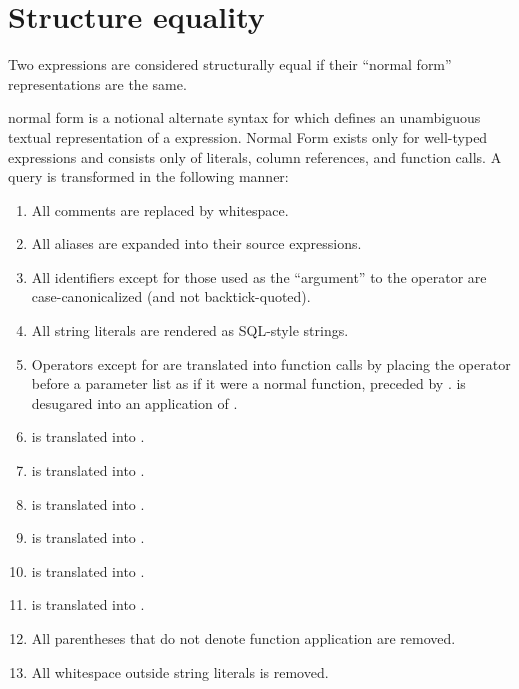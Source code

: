 \documentclass{article}
\begin{document}
\section{Structure equality}\label{structuralequality}

Two expressions are considered structurally equal if their ``normal
form'' representations are the same.

\SoQL{} normal form is a notional alternate syntax for \SoQL{} which
defines an unambiguous textual representation of a \SoQL{} expression.
Normal Form \SoQL{} exists only for well-typed expressions and
consists only of literals, column references, and function calls.  A
\SoQL{} query is transformed in the following manner:
\begin{enumerate}
\item All comments are replaced by whitespace.
\item All aliases are expanded into their source expressions.
\item All identifiers except for those used as the ``argument'' to the
   operator are case-canonicalized (and not backtick-quoted).
\item All string literals are rendered as SQL-style strings.
\item Operators except for  are translated into function calls
  by placing the operator before a parameter list as if it were a
  normal function, preceded by .   is desugared into
  an application of .
\item {} is translated into
  .
\item {} is translated into
  .
\item {} is translated
  into .
\item {} is translated
  into .
\item {} is translated
  into .
\item {} is translated
  into .
\item All parentheses that do not denote function application are removed.
\item All whitespace outside string literals is removed.
\end{enumerate}
\end{document}
